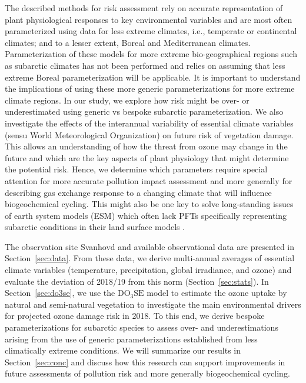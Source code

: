 \documentclass[bg, manuscript]{copernicus}
\begin{document}
The described methods for risk assessment rely on accurate representation of plant physiological responses to key environmental variables and are most often parameterized using data for less extreme climates, i.e., temperate or continental climates; and to a lesser extent, Boreal and Mediterranean climates. Parameterization of these models for more extreme bio-geographical regions such as subarctic climates has not been performed and relies on assuming that less extreme Boreal parameterization will be applicable. It is important to understand the implications of using these more generic parameterizations for more extreme climate regions. In our study, we explore how risk might be over- or underestimated using generic vs bespoke subarctic parameterization. We also investigate the effects of the interannual variability of essential climate variables (sensu World Meteorological Organization) on future risk of vegetation damage.
This allows an understanding of how the threat from ozone may change in the future and which are the key aspects of plant physiology that might determine the potential risk. Hence, we determine which parameters require special attention for more accurate pollution impact assessment and more generally for describing gas exchange response to a changing climate that will influence biogeochemical cycling. This might also be one key to solve long-standing issues of earth system models (ESM) which often lack PFTs specifically representing subarctic conditions in their land surface models \citep{GMD:Poulter2015,JAMES:Lawrence2019}. 

The observation site Svanhovd and available observational data are presented in Section~\ref{sec:data}. From these data, we derive multi-annual averages of essential climate variables (temperature, precipitation, global irradiance, and ozone) and evaluate the deviation of 2018/19 from this norm (Section~\ref{sec:stats}). In Section~\ref{sec:do3se}, we use the $\mathrm{DO_3SE}$ model to estimate the ozone uptake by natural and semi-natural vegetation to investigate the main environmental drivers for projected ozone damage risk in 2018. To this end, we derive bespoke parameterizations for subarctic species to assess over- and underestimations arising from the use of generic parameterizations established from less climatically extreme conditions. We will summarize our results in Section~\ref{sec:conc} and discuss how this research can support improvements in future assessments of pollution risk and more generally biogeochemical cycling.
\end{document}
